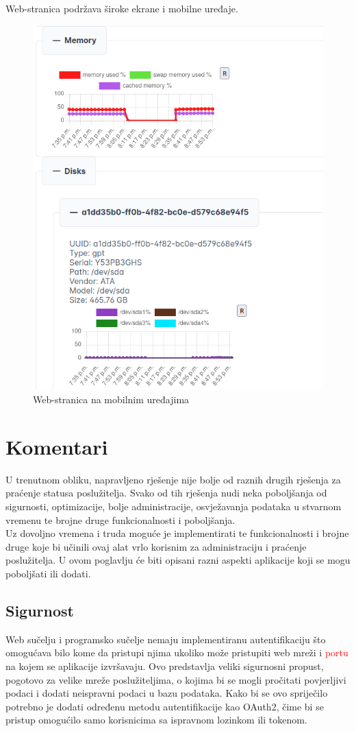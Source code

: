 \documentclass[zavrsnirad]{fer}
\begin{document}
Web-stranica podržava široke ekrane i mobilne uređaje.
\begin{figure}[htb]
	\centering
	\includegraphics[width=0.75\linewidth]{images/web_6.png} 
	\caption{Web-stranica na mobilnim uređajima}
\end{figure}
\FloatBarrier

\chapter{Komentari}
U trenutnom obliku, napravljeno rješenje nije bolje od raznih drugih rješenja za praćenje statusa poslužitelja. Svako od tih rješenja nudi neka poboljšanja od sigurnosti, optimizacije, bolje administracije, osvježavanja podataka u stvarnom vremenu te brojne druge funkcionalnosti i poboljšanja.
\\Uz dovoljno vremena i truda moguće je implementirati te funkcionalnosti i brojne druge koje bi učinili ovaj alat vrlo korisnim za administraciju i praćenje poslužitelja. U ovom poglavlju će biti opisani razni aspekti aplikacije koji se mogu poboljšati ili dodati.

\section{Sigurnost}
Web sučelju i programsko sučelje nemaju implementiranu autentifikaciju što omogućava bilo kome da pristupi njima ukoliko može pristupiti web mreži i \textcolor{red}{portu} na kojem se aplikacije izvršavaju. Ovo predstavlja veliki sigurnosni propust, pogotovo za velike mreže poslužiteljima, o kojima bi se mogli pročitati povjerljivi podaci i dodati neispravni podaci u bazu podataka. Kako bi se ovo spriječilo potrebno je dodati određenu metodu autentifikacije kao OAuth2, čime bi se pristup omogućilo samo korisnicima sa ispravnom lozinkom ili tokenom.
\end{document}
